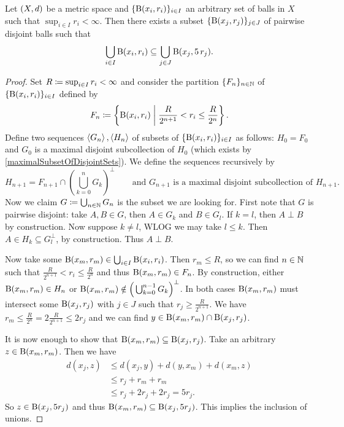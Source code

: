 \begin{proposition}
Let $\left( X,d \right)$ be a metric space and $\{\operatorname{B}(x_i, r_i)\}_{i\in I}$ an arbitrary set of balls in $X$ such that $\sup_{i\in I}r_i < \infty$. Then there exists a subset $\{\operatorname{B}(x_j, r_j)\}_{j\in J}$ of pairwise disjoint balls such that
\[ \bigcup_{i\in I}\operatorname{B}(x_i, r_i) \subseteq \bigcup_{j\in J} \operatorname{B}(x_j, 5\, r_j). \]
\end{proposition}
\begin{proof}
Set $R \coloneqq \sup_{i\in I}r_i < \infty$ and consider the partition $\{F_n\}_{n\in \mathbb{N}}$ of $\{\operatorname{B}(x_i, r_i)\}_{i\in I}$ defined by
\[ F_n \coloneqq \left\{ \operatorname{B}(x_i, r_i) \;\middle|\; \frac{R}{2^{n+1}} < r_i \leq \frac{R}{2^n} \right\}. \]
Define two sequences $\left\langle G_n \right\rangle, \left\langle H_n \right\rangle$ of subsets of $\{\operatorname{B}(x_i, r_i)\}_{i\in I}$ as follows: $H_0 = F_0$ and $G_0$ is a maximal disjoint subcollection of $H_0$ (which exists by \ref{maximalSubsetOfDisjointSets}). We define the sequences recursively by
\[ H_{n+1} = F_{n+1} \cap \left(\bigcup_{k=0}^nG_k\right)^\perp \qquad\text{and $G_{n+1}$ is a maximal disjoint subcollection of $H_{n+1}$.} \]
Now we claim $G \coloneqq \bigcup_{n\in\mathbb{N}}G_n$ is the subset we are looking for. First note that $G$ is pairwise disjoint: take $A,B\in G$, then $A\in G_k$ and $B\in G_l$. If $k = l$, then $A\perp B$ by construction. Now suppose $k\neq l$, WLOG we may take $l\leq k$. Then $A\in H_k \subseteq G_l^\perp$, by construction. Thus $A\perp B$.

Now take some $\operatorname{B}(x_m, r_m) \in \bigcup_{i\in I}\operatorname{B}(x_i, r_i)$. Then $r_m \leq R$, so we can find $n\in \mathbb{N}$ such that $\frac{R}{2^{n+1}} < r_i \leq \frac{R}{2^n}$ and thus $\operatorname{B}(x_m, r_m)\in F_n$. By construction, either $\operatorname{B}(x_m, r_m)\in H_n$ or $\operatorname{B}(x_m, r_m)\notin \Big(\bigcup_{k=0}^{n-1}G_k\Big)^\perp$. In both cases $\operatorname{B}(x_m, r_m)$ must intersect some $\operatorname{B}(x_j, r_j)$ with $j\in J$ such that $r_j \geq \frac{R}{2^{n+1}}$. We have $r_m \leq \frac{R}{2^n} = 2 \frac{R}{2^{n+1}} \leq 2 r_j$ and we can find $y\in \operatorname{B}(x_m, r_m) \cap \operatorname{B}(x_j, r_j)$.

It is now enough to show that $\operatorname{B}(x_m, r_m) \subseteq \operatorname{B}(x_j, r_j)$. Take an arbitrary $z\in \operatorname{B}(x_m, r_m)$. Then we have
\begin{align*}
d(x_j, z) &\leq d(x_j, y) + d(y, x_m) + d(x_m, z) \\
&\leq r_j + r_m + r_m \\
&\leq r_j + 2r_j + 2r_j = 5r_j.
\end{align*}
So $z\in \operatorname{B}(x_j, 5r_j)$ and thus $\operatorname{B}(x_m, r_m)\subseteq\operatorname{B}(x_j, 5r_j)$. This implies the inclusion of unions.
\end{proof}
